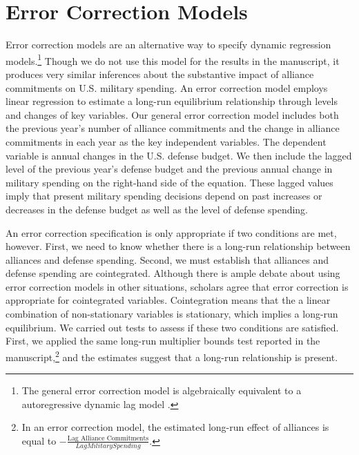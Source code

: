 \documentclass[12pt]{article}
\begin{document}
\section{Error Correction Models} 


Error correction models are an alternative way to specify dynamic regression models.\footnote{The general error correction model is algebraically equivalent to a autoregressive dynamic lag model \citep{DeBoefKeele2008}.}
Though we do not use this model for the results in the manuscript, it produces very similar inferences about the substantive impact of alliance commitments on U.S. military spending. 
An error correction model employs linear regression to estimate a long-run equilibrium relationship through levels and changes of key variables.
Our general error correction model includes both the previous year's number of alliance commitments and the change in alliance commitments in each year as the key independent variables. 
The dependent variable is annual changes in the U.S. defense budget.
We then include the lagged level of the previous year's defense budget and the previous annual change in military spending on the right-hand side of the equation.
These lagged values imply that present military spending decisions depend on past increases or decreases in the defense budget as well as the level of defense spending.


An error correction specification is only appropriate if two conditions are met, however. 
First, we need to know whether there is a long-run relationship between alliances and defense spending. 
Second, we must establish that alliances and defense spending are cointegrated. 
Although there is ample debate about using error correction models in other situations, scholars agree that error correction is appropriate for cointegrated variables\citep{EngleGranger1987, DeBoefKeele2008, GrantLebo2016, Ennsetal2016}. 
Cointegration means that the a linear combination of non-stationary variables is stationary, which implies a long-run equilibrium.  
We carried out tests to assess if these two conditions are satisfied. 
First, we applied the same long-run multiplier bounds test reported in the manuscript,\footnote{In an error correction model, the estimated long-run effect of alliances is equal to $-\frac{\mbox{Lag Alliance Commitments}}{Lag Military Spending}$.} and the estimates suggest that a long-run relationship is present. 
\end{document}
